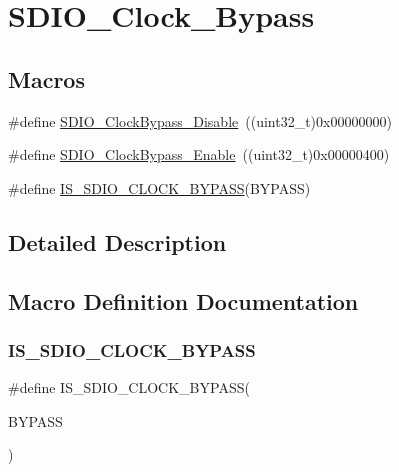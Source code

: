 \hypertarget{group___s_d_i_o___clock___bypass}{}\section{S\+D\+I\+O\+\_\+\+Clock\+\_\+\+Bypass}
\label{group___s_d_i_o___clock___bypass}
\subsection*{Macros}
\begin{DoxyCompactItemize}
\item 
\#define \mbox{\hyperlink{group___s_d_i_o___clock___bypass_gacc168d55136a0c6575e5afd7a6550343}{S\+D\+I\+O\+\_\+\+Clock\+Bypass\+\_\+\+Disable}}~((uint32\+\_\+t)0x00000000)
\item 
\#define \mbox{\hyperlink{group___s_d_i_o___clock___bypass_ga5e1e9f7e05ea62dd2315eb556bc10e5c}{S\+D\+I\+O\+\_\+\+Clock\+Bypass\+\_\+\+Enable}}~((uint32\+\_\+t)0x00000400)
\item 
\#define \mbox{\hyperlink{group___s_d_i_o___clock___bypass_ga5d5a2fcdd3150e4a89c5aa1efd738dec}{I\+S\+\_\+\+S\+D\+I\+O\+\_\+\+C\+L\+O\+C\+K\+\_\+\+B\+Y\+P\+A\+SS}}(B\+Y\+P\+A\+SS)
\end{DoxyCompactItemize}


\subsection{Detailed Description}


\subsection{Macro Definition Documentation}
\mbox{\label{group___s_d_i_o___clock___bypass_ga5d5a2fcdd3150e4a89c5aa1efd738dec}} 
\subsubsection{\texorpdfstring{IS\_SDIO\_CLOCK\_BYPASS}{IS\_SDIO\_CLOCK\_BYPASS}}
{\footnotesize\ttfamily \#define I\+S\+\_\+\+S\+D\+I\+O\+\_\+\+C\+L\+O\+C\+K\+\_\+\+B\+Y\+P\+A\+SS(\begin{DoxyParamCaption}\item[{}]{B\+Y\+P\+A\+SS }\end{DoxyParamCaption})}

